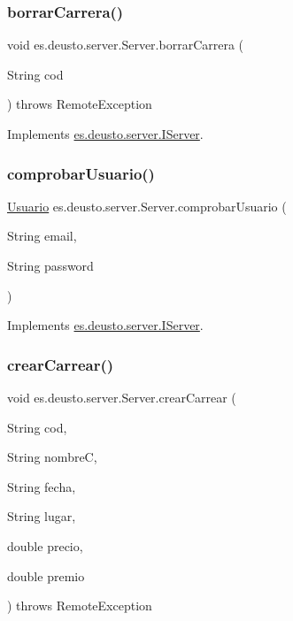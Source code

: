 \subsubsection{\texorpdfstring{borrarCarrera()}{borrarCarrera()}}
{\footnotesize\ttfamily void es.\+deusto.\+server.\+Server.\+borrar\+Carrera (\begin{DoxyParamCaption}\item[{String}]{cod }\end{DoxyParamCaption}) throws Remote\+Exception}



Implements \mbox{\hyperlink{interfacees_1_1deusto_1_1server_1_1_i_server_aaf52191bb3f870f0fcbdd58ffa7bd9c7}{es.\+deusto.\+server.\+I\+Server}}.

\mbox{\label{classes_1_1deusto_1_1server_1_1_server_afa3e758715cbf321f9c1cbe08a8583a4}} 
\subsubsection{\texorpdfstring{comprobarUsuario()}{comprobarUsuario()}}
{\footnotesize\ttfamily \mbox{\hyperlink{classes_1_1deusto_1_1server_1_1jdo_1_1_usuario}{Usuario}} es.\+deusto.\+server.\+Server.\+comprobar\+Usuario (\begin{DoxyParamCaption}\item[{String}]{email,  }\item[{String}]{password }\end{DoxyParamCaption})}



Implements \mbox{\hyperlink{interfacees_1_1deusto_1_1server_1_1_i_server_a864d05d99ec3891208c39d8352221656}{es.\+deusto.\+server.\+I\+Server}}.

\mbox{\label{classes_1_1deusto_1_1server_1_1_server_a22d31cd9642f978f1995fc7822d99258}} 
\subsubsection{\texorpdfstring{crearCarrear()}{crearCarrear()}}
{\footnotesize\ttfamily void es.\+deusto.\+server.\+Server.\+crear\+Carrear (\begin{DoxyParamCaption}\item[{String}]{cod,  }\item[{String}]{nombreC,  }\item[{String}]{fecha,  }\item[{String}]{lugar,  }\item[{double}]{precio,  }\item[{double}]{premio }\end{DoxyParamCaption}) throws Remote\+Exception}




